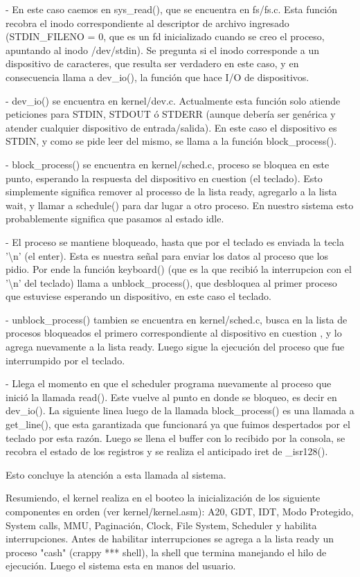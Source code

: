 - En este caso caemos en sys\_read(), que se encuentra en fs/fs.c. Esta función
recobra el inodo correspondiente al descriptor de archivo ingresado
(STDIN\_FILENO = 0, que es un fd inicializado cuando se creo el proceso,
apuntando al inodo /dev/stdin). Se pregunta si el inodo corresponde a un
dispositivo de caracteres, que resulta ser verdadero en este caso, y en
consecuencia llama a dev\_io(), la función que hace I/O de dispositivos.

- dev\_io() se encuentra en kernel/dev.c. Actualmente esta función solo atiende
peticiones para STDIN, STDOUT ó STDERR (aunque debería ser genérica y atender
cualquier dispositivo de entrada/salida). En este caso el dispositivo es STDIN,
y como se pide leer del mismo, se llama a la función block\_process().

- block\_process() se encuentra en kernel/sched.c, proceso se bloquea en este
punto, esperando la respuesta del dispositivo en cuestion (el teclado). Esto
simplemente significa remover al processo de la lista ready, agregarlo a la
lista wait, y llamar a schedule() para dar lugar a otro proceso. En nuestro
sistema esto probablemente significa que pasamos al estado idle.

- El proceso se mantiene bloqueado, hasta que por el teclado es enviada la
tecla '\textbackslash n' (el enter). Esta es nuestra señal para enviar los
datos al proceso que los pidio. Por ende la función keyboard() (que es la
que recibió la interrupcion con el '\textbackslash n' del teclado) llama a
unblock\_process(), que desbloquea al primer proceso que estuviese esperando
un dispositivo, en este caso el teclado.

- unblock\_process() tambien se encuentra en kernel/sched.c, busca en la lista
de procesos bloqueados el primero correspondiente al dispositivo en cuestion
, y lo agrega nuevamente a la lista ready. Luego sigue la ejecución del proceso
que fue interrumpido por el teclado.

- Llega el momento en que el scheduler programa nuevamente al proceso que
inició la llamada read(). Este vuelve al punto en donde se bloqueo, es decir en
dev\_io(). La siguiente linea luego de la llamada block\_process() es una
llamada a get\_line(), que esta garantizada que funcionará ya que fuimos
despertados por el teclado por esta razón. Luego se llena el buffer con lo
recibido por la consola, se recobra el estado de los registros y se realiza el
anticipado iret de \_isr128().

Esto concluye la atención a esta llamada al sistema.

Resumiendo, el kernel realiza en el booteo la inicialización de los siguiente
componentes en orden (ver kernel/kernel.asm): A20, GDT, IDT, Modo Protegido,
System calls, MMU, Paginación, Clock, File System, Scheduler y habilita
interrupciones. Antes de habilitar interrupciones se agrega a la lista ready un
proceso "cash" (crappy *** shell), la shell que termina manejando el hilo de
ejecución. Luego el sistema esta en manos del usuario.
